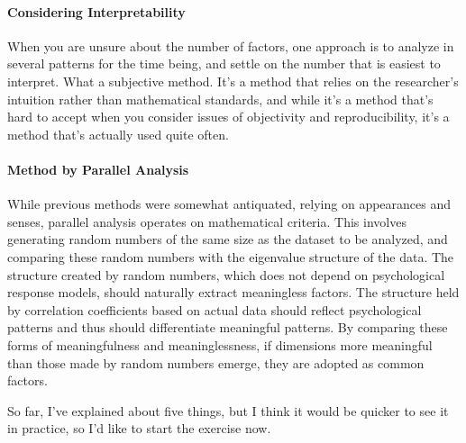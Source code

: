 \documentclass{ltjsbook}
\begin{document}
\paragraph{Considering Interpretability} When you are unsure about the number of factors, one approach is to analyze in several patterns for the time being, and settle on the number that is easiest to interpret. What a subjective method. It's a method that relies on the researcher's intuition rather than mathematical standards, and while it's a method that's hard to accept when you consider issues of objectivity and reproducibility, it's a method that's actually used quite often.
\paragraph{Method by Parallel Analysis} While previous methods were somewhat antiquated, relying on appearances and senses, parallel analysis operates on mathematical criteria. This involves generating random numbers of the same size as the dataset to be analyzed, and comparing these random numbers with the eigenvalue structure of the data. The structure created by random numbers, which does not depend on psychological response models, should naturally extract meaningless factors. The structure held by correlation coefficients based on actual data should reflect psychological patterns and thus should differentiate meaningful patterns. By comparing these forms of meaningfulness and meaninglessness, if dimensions more meaningful than those made by random numbers emerge, they are adopted as common factors.

So far, I've explained about five things, but I think it would be quicker to see it in practice, so I'd like to start the exercise now.
\end{document}
